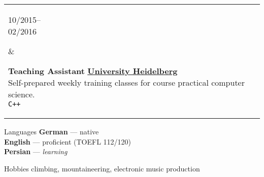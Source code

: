 \documentclass{article}
\newenvironment{entrylist}{
	\begin{longtable}[H]{l l}
}{
	\end{longtable}
}
\newcommand{\entry}[4]{%
	\parbox[t]{0.175\linewidth}{#1} &
	\parbox[t]{0.825\linewidth}{
		\textbf{#2}%
		\hfill%
		{\footnotesize \textbf{\textcolor{black}{#3}}}\\%
		{\small #4} %
    }\\\\}
\newcommand{\slashsep}{\hspace{2mm}/\hspace{2mm}}
\begin{document}
\begin{entrylist}
    \entry
    {10/2015--\\02/2016}
    {Teaching Assistant}
    {\href{https://www.uni-heidelberg.de/en}{University Heidelberg}}
    {
        Self-prepared weekly training classes for course practical computer science.\\
        \texttt{C++}
    }

    \entry
    {06/2015--}
    {CO-Founder\ /\ Voluntary work}
    {\href{https://collegiumacademicum.de}{Collegium Academicum, Heidelberg}}
    {
        Student-founded non-profit company building sustainable student housing.
        We are building an innovative living space for 200 young people.
        Creating an educational center for holistic self-learning.\\
        \texttt{team building}\slashsep\texttt{lead generation}\slashsep\texttt{design work}\slashsep\texttt{writing grant applications}
    }
\end{entrylist}

\hfill
\begin{cvbox}{Languages}
	\textbf{German} --- native\\
	\textbf{English} --- proficient (TOEFL 112/120)\\
    \textbf{Persian} --- \textit{learning}
\end{cvbox}
\begin{cvbox}{Hobbies}
    climbing, mountaineering, electronic music production
\end{cvbox}


\end{document}
